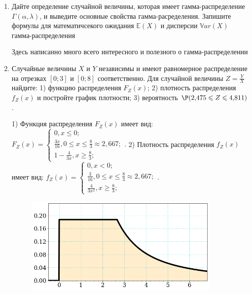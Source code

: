 \documentclass[a4paper,14pt]{article}
\begin{document}
\begin{enumerate}


\item

Дайте определение случайной величины, которая имеет гамма-распределение $\Gamma(\alpha,  \lambda)$, и выведите основные свойства гамма-расределения. Запишите формулы для математичсекого ожидания
$\mathbb{E}(X)$ и дисперсии $\mathbb{V}ar(X)$ гамма-распределения




Здесь написанно много всего интересного и полезного о гамма-распределении


\item



Случайные величины $X$ и $Y$ независимы и имеют равномерное
распределение на отрезках $[0;3]$ и $[0;8]$ соответственно. Для случайной величины $Z=\frac{Y}{X}$ найдите: 
1) функцию распределения $F_Z(x)$;
2) плотность распределения $f_Z(x)$ и постройте график плотности;
3) вероятность $\P(2,\!475\leqslant Z\leqslant 4,\!811)$.




1) Функция распределения $F_Z(x)$ имеет вид:
$
F_Z(x)=\left\{
\begin{array}{l}
0, x\leqslant 0;\\
\frac{3 x}{16}, 0\leqslant x\leqslant \frac{8}{3}\approx 2,\!667;\\
1 - \frac{4}{3 x}, x\geqslant\frac{8}{3};
\end{array}.
\right.
$
2) Плотность распределения $f_Z(x)$ имеет вид:
$
f_Z(x)=\left\{
\begin{array}{l}
0, x<0;\\
\frac{3}{16}, 0\leqslant x\leqslant \frac{8}{3}\approx 2,\!667;\\
\frac{4}{3 x^{2}}, x\geqslant\frac{8}{3};
\end{array}.
\right.
$


\begin{figure}[H]
    \includegraphics[width=0.9\textwidth]{2_53d8}
\end{figure}



\end{enumerate}
\end{document}
